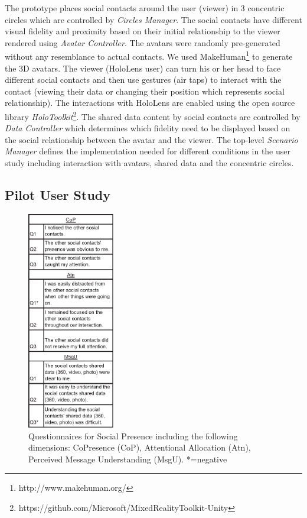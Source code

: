 The prototype places social contacts around the user (viewer) in 3 concentric circles which are controlled by \textit{Circles Manager}. The social contacts have different visual fidelity and proximity based on their initial relationship to the viewer rendered using \textit{Avatar Controller}. The avatars were randomly pre-generated without any resemblance to actual contacts. We used MakeHuman\footnote{http://www.makehuman.org/} to generate the 3D avatars. The viewer (HoloLens user) can turn his or her head to face different social contacts and then use gestures (air taps) to interact with the contact (viewing their data or changing their position which represents social relationship). The interactions with HoloLens are enabled using the open source library \textit{HoloToolkit}\footnote{https://github.com/Microsoft/MixedRealityToolkit-Unity}. The shared data content by social contacts are controlled by \textit{Data Controller} which determines which fidelity need to be displayed based on the social relationship between the avatar and the viewer. The top-level \textit{Scenario Manager} defines the implementation needed for different conditions in the user study including interaction with avatars, shared data and the concentric circles. 

\subsection{Pilot User Study}


\begin{figure}[ht]
	\centering
	\includegraphics[width=1.5in]{images/chi/images-02.eps}
	\caption{Questionnaires for Social Presence including the following dimensions: CoPresence (CoP), Attentional Allocation (Atn), Perceived Message Understanding (MsgU). *=negative} 
  	\label{tbl:questions}
\end{figure}

